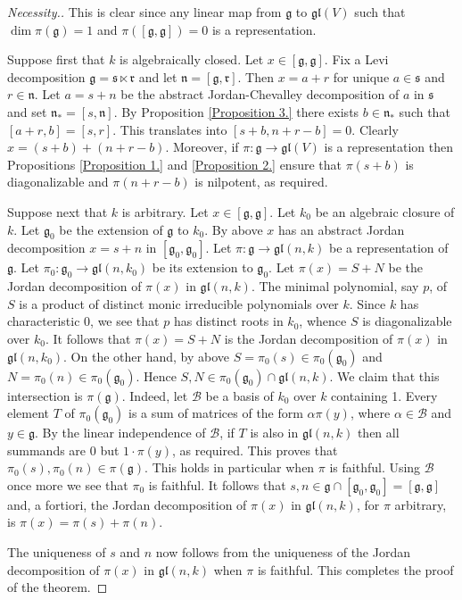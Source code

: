 \documentclass{amsart}
\theoremstyle{definition}
\theoremstyle{remark}
\numberwithin{equation}{section}
\newcommand \g{{\mathfrak g}}
\newcommand  \s{{\mathfrak s}}
\renewcommand \r{{\mathfrak r}}
\def \n{{\mathfrak n}}
\newcommand \gl{{\mathfrak {gl}}}
\newcommand \B{{\mathcal B}}
\begin{document}
\begin{proof}[Necessity.] This is clear since any linear
map from $\g$ to $\gl(V)$ such that $\dim\pi(\g)=1$ and $\pi([\g,\g])=0$
is a representation.

\smallskip

 Suppose first that $k$ is
algebraically closed. Let $x\in [\g,\g]$. Fix a Levi decomposition
$\g=\s\ltimes \r$ and let $\n=[\g,\r]$. Then $x=a+r$ for unique
$a\in\s$ and $r\in \n$. Let $a=s+n$ be the abstract
Jordan-Chevalley decomposition of $a$ in $\s$ and set
$\n_*=[s,\n]$. By Proposition \ref{Proposition 3.} there exists
$b\in\n_*$ such that $[a+r,b]=[s,r]$. This translates into
$[s+b,n+r-b]=0$. Clearly $x=(s+b)+(n+r-b)$. Moreover, if
$\pi:\g\to\gl(V)$ is a representation then Propositions
\ref{Proposition 1.} and \ref{Proposition 2.} ensure that
$\pi(s+b)$ is diagonalizable and $\pi(n+r-b)$ is nilpotent, as
required.


Suppose next that $k$ is arbitrary. Let $x\in[\g,\g]$.
Let $k_0$ be an algebraic closure of $k$.
Let $\g_0$ be the extension of $\g$ to $k_0$. By above $x$ has an abstract Jordan
decomposition $x=s+n$ in $[\g_0,\g_0]$. Let $\pi:\g\to\gl(n,k)$ be a representation of $\g$.
Let $\pi_0:\g_0\to \gl(n,k_0)$ be its extension to $\g_0$.
Let $\pi(x)=S+N$ be the Jordan decomposition of $\pi(x)$ in $\gl(n,k)$.
The minimal polynomial, say  $p$, of $S$ is a product of distinct monic
irreducible polynomials over $k$.
Since $k$ has characteristic 0, we see that $p$ has distinct roots in $k_0$,
whence $S$ is diagonalizable
over $k_0$. It follows that $\pi(x)=S+N$ is the Jordan decomposition of $\pi(x)$ in $\gl(n,k_0)$.
On the other hand, by above $S=\pi_0(s)\in \pi_0(\g_0)$ and $N=\pi_0(n)\in\pi_0(\g_0)$.
Hence $S,N\in \pi_0(\g_0)\cap \gl(n,k)$. We claim
that this intersection is $\pi(\g)$. Indeed, let $\B$
be a basis of $k_0$ over $k$ containing 1. Every element $T$ of $\pi_0(\g_0)$
is a sum of matrices of the form $\alpha\pi(y)$,
where $\alpha\in \B$ and $y\in \g$. By the linear independence of $\B$,
if $T$ is also in $\gl(n,k)$ then all summands
are 0 but $1\cdot \pi(y)$, as required. This proves that $\pi_0(s),\pi_0(n)\in \pi(\g)$.
This holds in particular
when $\pi$ is faithful. Using $\B$ once more we see that $\pi_0$
is faithful. It follows that $s,n\in\g\cap[\g_0,\g_0]=[\g,\g]$ and, a fortiori, the Jordan decomposition of
$\pi(x)$ in $\gl(n,k)$, for $\pi$ arbitrary,
is $\pi(x)=\pi(s)+\pi(n)$.

The uniqueness of $s$ and $n$ now follows from the uniqueness of the Jordan
decomposition of $\pi(x)$ in $\gl(n,k)$
when $\pi$ is faithful. This completes the proof of the theorem.
\end{proof}
\end{document}
